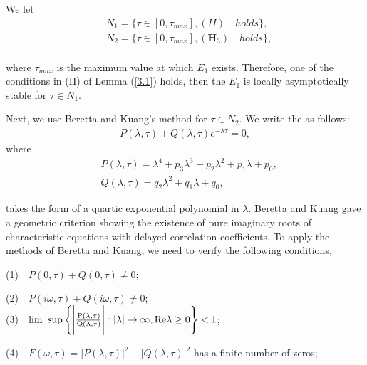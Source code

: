 \documentclass{CMHPhD-SIVD}
\begin{document}
We let
\begin{align*}
&N_1=\{\tau\in[0, \tau_{max}], (II) \quad holds\}, \\
&N_2=\{\tau\in[0, \tau_{max}], (\mathbf{H}_3) \quad holds\}, \\
\end{align*}

where $\tau_{max}$ is the maximum value at which $E_1$ exists. Therefore, one of the conditions in (II) of Lemma (\ref{3.1}) holds, then
the $E_1$ is locally asymptotically stable for $\tau\in N_1$.


Next, we use Beretta and Kuang's \cite{beretta2002geometric} method for $\tau\in N_2$. We write the   as follows:
\begin{equation}\label{13}
   \begin{array}{ll}
   P(\lambda,\tau)+Q(\lambda,\tau)e^{-\lambda \tau}=0,
   \end{array}
\end{equation}
where
\begin{equation}\label{14}
\begin{array}{ll}
   &P(\lambda,\tau)=\lambda^4+p_3 \lambda^3+p_2 \lambda^2+p_1 \lambda+p_0,\\
   &Q(\lambda,\tau)=q_2 \lambda^2+q_1 \lambda+q_0,
   \end{array}
\end{equation}


 takes the form of a quartic exponential polynomial in $\lambda$. Beretta and Kuang gave a geometric criterion showing the existence of pure imaginary roots of characteristic equations with delayed correlation coefficients. To apply the methods of Beretta and Kuang, we need to verify the following conditions,

(1)$\quad P(0,\tau)+Q(0,\tau)\neq0$;

(2)$\quad P(i \omega,\tau)+Q(i\omega,\tau)\neq0$;\\

(3)$\quad \rm lim$ $\rm sup\left\{\Bigg|\frac{P(\lambda,\tau)}{Q(\lambda,\tau)}\Bigg|:|\lambda|\rightarrow\infty, Re \lambda\geq0\right \}<1$;

(4)$\quad F(\omega,\tau)=|P(\lambda,\tau)|^2-|Q(\lambda,\tau)|^2$ has a finite number of zeros;\\
\end{document}

